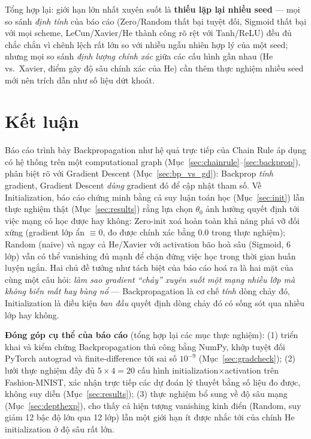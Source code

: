 \documentclass[12pt,a4paper]{article}
\begin{document}
Tổng hợp lại: giới hạn lớn nhất xuyên suốt là \textbf{thiếu lặp lại nhiều
seed} --- mọi so sánh \emph{định tính} của báo cáo (Zero/Random thất bại
tuyệt đối, Sigmoid thất bại với mọi scheme, LeCun/Xavier/He thành công rõ
rệt với Tanh/ReLU) đều đủ chắc chắn vì chênh lệch rất lớn so với nhiễu
ngẫu nhiên hợp lý của một seed; nhưng mọi so sánh \emph{định lượng chính
xác} giữa các cấu hình gần nhau (He vs.\ Xavier, điểm gãy độ sâu chính
xác của He) cần thêm thực nghiệm nhiều seed mới nên trích dẫn như số liệu
dứt khoát.

\section{Kết luận}

Báo cáo trình bày Backpropagation như hệ quả trực tiếp của Chain Rule áp
dụng có hệ thống trên một computational graph (Mục~\ref{sec:chainrule}--\ref{sec:backprop}),
phân biệt rõ với Gradient Descent (Mục~\ref{sec:bp_vs_gd}): Backprop
\emph{tính} gradient, Gradient Descent \emph{dùng} gradient đó để cập nhật
tham số. Về Initialization, báo cáo chứng minh bằng cả suy luận toán học
(Mục~\ref{sec:init}) lẫn thực nghiệm thật (Mục~\ref{sec:results}) rằng lựa
chọn $\theta_0$ ảnh hưởng quyết định tới việc mạng có học được hay không:
Zero-init xoá hoàn toàn khả năng phá vỡ đối xứng (gradient lớp ẩn $\equiv0$,
đo được chính xác bằng $0.0$ trong thực nghiệm); Random (naive) và ngay
cả He/Xavier với activation bão hoà sâu (Sigmoid, 6 lớp) vẫn có thể
vanishing đủ mạnh để chặn đứng việc học trong thời gian huấn luyện ngắn.
Hai chủ đề tưởng như tách biệt của báo cáo hoá ra là hai mặt của cùng một
câu hỏi: \emph{làm sao gradient ``chảy'' xuyên suốt một mạng nhiều lớp mà
không biến mất hay bùng nổ} --- Backpropagation là cơ chế \emph{tính}
dòng chảy đó, Initialization là điều kiện \emph{ban đầu} quyết định dòng
chảy đó có sống sót qua nhiều lớp hay không.

\textbf{Đóng góp cụ thể của báo cáo} (tổng hợp lại các mục thực nghiệm):
(1) triển khai và kiểm chứng Backpropagation thủ công bằng NumPy, khớp
tuyệt đối PyTorch autograd và finite-difference tới sai số $10^{-9}$
(Mục~\ref{sec:gradcheck}); (2) lưới thực nghiệm đầy đủ $5\times4=20$ cấu
hình initialization$\times$activation trên Fashion-MNIST, xác nhận trực
tiếp các dự đoán lý thuyết bằng số liệu đo được, không suy diễn
(Mục~\ref{sec:results}); (3) thực nghiệm bổ sung về độ sâu mạng
(Mục~\ref{sec:depthexp}), cho thấy cả hiện tượng vanishing kinh điển
(Random, suy giảm 12 bậc độ lớn qua 12 lớp) lẫn một giới hạn ít được nhắc
tới của chính He initialization ở độ sâu rất lớn.
\end{document}

